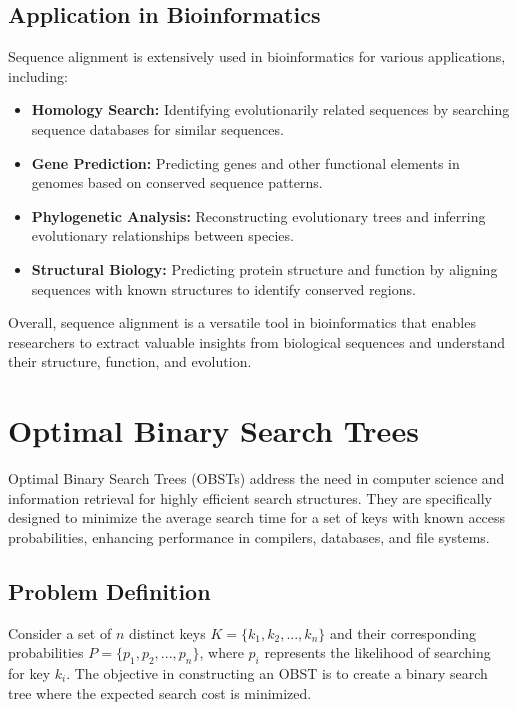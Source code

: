 \documentclass[12pt]{book} %
\begin{document}
\subsection{Application in Bioinformatics}

Sequence alignment is extensively used in bioinformatics for various applications, including:
\begin{itemize}
    \item \textbf{Homology Search:} Identifying evolutionarily related sequences by searching sequence databases for similar sequences.
    \item \textbf{Gene Prediction:} Predicting genes and other functional elements in genomes based on conserved sequence patterns.
    \item \textbf{Phylogenetic Analysis:} Reconstructing evolutionary trees and inferring evolutionary relationships between species.
    \item \textbf{Structural Biology:} Predicting protein structure and function by aligning sequences with known structures to identify conserved regions.
\end{itemize}

Overall, sequence alignment is a versatile tool in bioinformatics that enables researchers to extract valuable insights from biological sequences and understand their structure, function, and evolution.

\section{Optimal Binary Search Trees}

Optimal Binary Search Trees (OBSTs) address the need in computer science and information retrieval for highly efficient search structures. They are specifically designed to minimize the average search time for a set of keys with known access probabilities, enhancing performance in compilers, databases, and file systems.

\subsection{Problem Definition}

Consider a set of \(n\) distinct keys \(K = \{k_1, k_2, ..., k_n\}\) and their corresponding probabilities \(P = \{p_1, p_2, ..., p_n\}\), where \(p_i\) represents the likelihood of searching for key \(k_i\). The objective in constructing an OBST is to create a binary search tree where the expected search cost is minimized.
\end{document}
